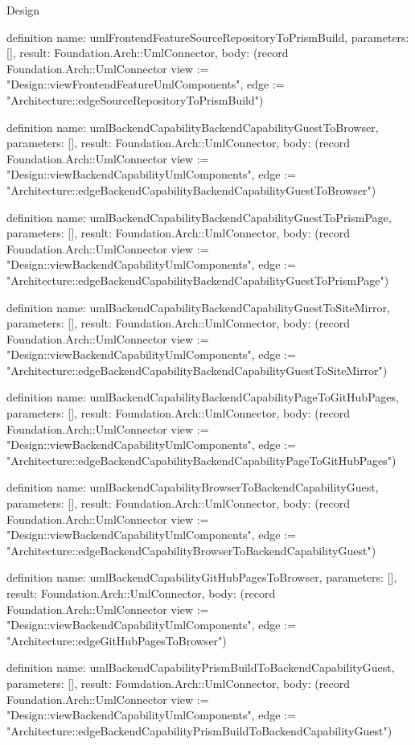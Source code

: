 \begin{lexlean}{Design}
\begin{semanticmodule}
definition{
  name: umlFrontendFeatureSourceRepositoryToPrismBuild,
  parameters: [],
  result: Foundation.Arch::UmlConnector,
  body: (record Foundation.Arch::UmlConnector {view := "Design::viewFrontendFeatureUmlComponents", edge := "Architecture::edgeSourceRepositoryToPrismBuild"})
}

definition{
  name: umlBackendCapabilityBackendCapabilityGuestToBrowser,
  parameters: [],
  result: Foundation.Arch::UmlConnector,
  body: (record Foundation.Arch::UmlConnector {view := "Design::viewBackendCapabilityUmlComponents", edge := "Architecture::edgeBackendCapabilityBackendCapabilityGuestToBrowser"})
}

definition{
  name: umlBackendCapabilityBackendCapabilityGuestToPrismPage,
  parameters: [],
  result: Foundation.Arch::UmlConnector,
  body: (record Foundation.Arch::UmlConnector {view := "Design::viewBackendCapabilityUmlComponents", edge := "Architecture::edgeBackendCapabilityBackendCapabilityGuestToPrismPage"})
}

definition{
  name: umlBackendCapabilityBackendCapabilityGuestToSiteMirror,
  parameters: [],
  result: Foundation.Arch::UmlConnector,
  body: (record Foundation.Arch::UmlConnector {view := "Design::viewBackendCapabilityUmlComponents", edge := "Architecture::edgeBackendCapabilityBackendCapabilityGuestToSiteMirror"})
}

definition{
  name: umlBackendCapabilityBackendCapabilityPageToGitHubPages,
  parameters: [],
  result: Foundation.Arch::UmlConnector,
  body: (record Foundation.Arch::UmlConnector {view := "Design::viewBackendCapabilityUmlComponents", edge := "Architecture::edgeBackendCapabilityBackendCapabilityPageToGitHubPages"})
}

definition{
  name: umlBackendCapabilityBrowserToBackendCapabilityGuest,
  parameters: [],
  result: Foundation.Arch::UmlConnector,
  body: (record Foundation.Arch::UmlConnector {view := "Design::viewBackendCapabilityUmlComponents", edge := "Architecture::edgeBackendCapabilityBrowserToBackendCapabilityGuest"})
}

definition{
  name: umlBackendCapabilityGitHubPagesToBrowser,
  parameters: [],
  result: Foundation.Arch::UmlConnector,
  body: (record Foundation.Arch::UmlConnector {view := "Design::viewBackendCapabilityUmlComponents", edge := "Architecture::edgeGitHubPagesToBrowser"})
}

definition{
  name: umlBackendCapabilityPrismBuildToBackendCapabilityGuest,
  parameters: [],
  result: Foundation.Arch::UmlConnector,
  body: (record Foundation.Arch::UmlConnector {view := "Design::viewBackendCapabilityUmlComponents", edge := "Architecture::edgeBackendCapabilityPrismBuildToBackendCapabilityGuest"})
}


\end{semanticmodule}
\end{lexlean}
